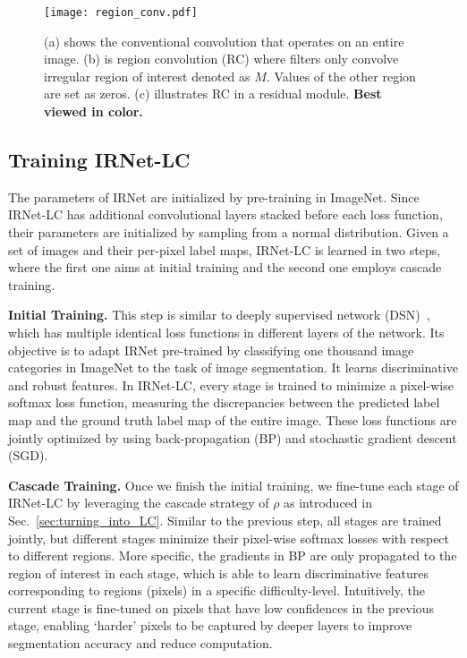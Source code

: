 \documentclass[10pt,twocolumn,letterpaper]{article}
\begin{document}
\begin{figure}[t]
    \centering
    \texttt{[image: region\_conv.pdf]}
    \vskip -0.2cm
    \caption{\small{(a) shows the conventional convolution that operates on an entire image. (b) is region convolution (RC) where filters only convolve irregular region of interest denoted as $M$. Values of the other region are set as zeros. (c) illustrates RC in a residual module. \textbf{Best viewed in color.}}}
    \label{fig:region_conv}
    \vspace{-12pt}
\end{figure}




\subsection{Training IRNet-LC}\label{sec:training}
The parameters of IRNet are initialized by pre-training in ImageNet.
Since IRNet-LC has additional convolutional layers stacked before each loss function, their parameters are initialized by sampling from a normal distribution.
Given a set of images and their per-pixel label maps, IRNet-LC is learned in two steps, where the first one aims at initial training and the second one employs cascade training.



\noindent
\textbf{Initial Training.}
This step is similar to deeply supervised network (DSN)~\cite{lee2015deeply}, which has multiple identical loss functions in different layers of the network.
Its objective is to adapt IRNet pre-trained by classifying one thousand image categories in ImageNet to the task of image segmentation.
It learns discriminative and robust features.
In IRNet-LC, every stage is trained to minimize a pixel-wise softmax loss function, measuring the discrepancies between the predicted label map and the ground truth label map of the entire image.
These loss functions are jointly optimized by using back-propagation (BP) and stochastic gradient descent (SGD).





\noindent
\textbf{Cascade Training.}
Once we finish the initial training, we fine-tune each stage of IRNet-LC by leveraging the cascade strategy of $\rho$ as introduced in Sec.~\ref{sec:turning_into_LC}.
Similar to the previous step, all stages are trained jointly, but different stages minimize their pixel-wise softmax losses with respect to different regions.
More specific, the gradients in BP are only propagated to the region of interest in each stage, which is able to learn discriminative features corresponding to regions (pixels) in a specific difficulty-level.
Intuitively, the current stage is fine-tuned on pixels that have low confidences in the previous stage,
enabling `harder' pixels to be captured by deeper layers to improve segmentation accuracy and reduce computation.
\end{document}
